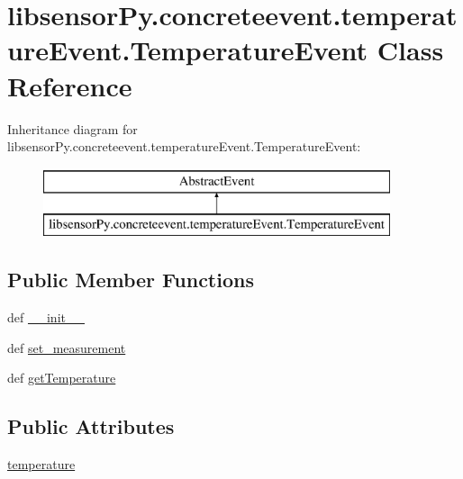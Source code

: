 \hypertarget{classlibsensorPy_1_1concreteevent_1_1temperatureEvent_1_1TemperatureEvent}{}\section{libsensor\+Py.\+concreteevent.\+temperature\+Event.\+Temperature\+Event Class Reference}
\label{classlibsensorPy_1_1concreteevent_1_1temperatureEvent_1_1TemperatureEvent}
Inheritance diagram for libsensor\+Py.\+concreteevent.\+temperature\+Event.\+Temperature\+Event\+:\begin{figure}[H]
\begin{center}
\leavevmode
\includegraphics[height=2.000000cm]{classlibsensorPy_1_1concreteevent_1_1temperatureEvent_1_1TemperatureEvent}
\end{center}
\end{figure}
\subsection*{Public Member Functions}
\begin{DoxyCompactItemize}
\item 
def \hyperlink{classlibsensorPy_1_1concreteevent_1_1temperatureEvent_1_1TemperatureEvent_a2bf6199886c224694e1cdfd8c4b0e440}{\+\_\+\+\_\+init\+\_\+\+\_\+}
\item 
def \hyperlink{classlibsensorPy_1_1concreteevent_1_1temperatureEvent_1_1TemperatureEvent_afb0bed75bd8fd9883f2c96aff468787d}{set\+\_\+measurement}
\item 
def \hyperlink{classlibsensorPy_1_1concreteevent_1_1temperatureEvent_1_1TemperatureEvent_a2160c11796935ce32885f16b72d950c1}{get\+Temperature}
\end{DoxyCompactItemize}
\subsection*{Public Attributes}
\begin{DoxyCompactItemize}
\item 
\hyperlink{classlibsensorPy_1_1concreteevent_1_1temperatureEvent_1_1TemperatureEvent_a0990f7787cc7f43fe7faab4d9b2b1873}{temperature}
\end{DoxyCompactItemize}
